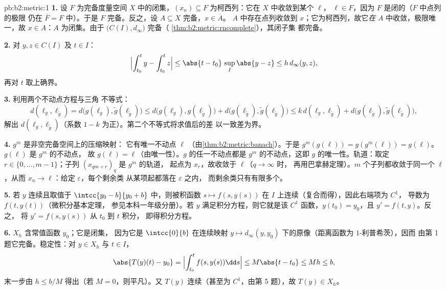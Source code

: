 \begin{solution}{pb:b2:metric:1}
\textbf{1.} 设 $F$ 为完备度量空间 $X$ 中的闭集，$(x_n)
\subseteq F$ 为柯西列：它在 $X$ 中收敛到某个 $\ell$，
$\ell \in F$，因为 $F$ 是闭的（$F$ 中点列的极限
仍在 $\overline F = F$ 中）。于是 $F$ 完备。反之，设 $A
\subseteq X$ 完备，$x \in \overline A$。
$A$ 中存在点列收敛到 $x$；它为柯西列，故它\emph{在}
$A$ 中收敛，极限唯一，故 $x \in A$：$A$ 为闭集。由于
$\bigl(C(I), d_\infty\bigr)$ 完备（
\cref{thm:b2:metric:rncomplete}），其闭子集
都完备。

\textbf{2.} 对 $y, z \in C(I)$ 及 $t \in I$：
\[
\Bigl|\int_{t_0}^{t}y - \int_{t_0}^{t}z\Bigr| \leq
\abs{t - t_0}\,\sup_I\abs{y - z} \leq h\,d_\infty(y, z),
\]
再对 $t$ 取上确界。

\textbf{3.} 利用两个不动点方程与三角
不等式：
\[
d(\ell_g, \ell_{\widetilde g})
= d\bigl(g(\ell_g), \widetilde g(\ell_{\widetilde g})\bigr)
\leq d\bigl(g(\ell_g), g(\ell_{\widetilde g})\bigr) +
d\bigl(g(\ell_{\widetilde g}), \widetilde g(\ell_{\widetilde
g})\bigr)
\leq k\,d(\ell_g, \ell_{\widetilde g}) +
d\bigl(g(\ell_{\widetilde g}), \widetilde g(\ell_{\widetilde
g})\bigr),
\]
解出 $d(\ell_g, \ell_{\widetilde g})$（系数
$1 - k$ 为正）。第二个不等式将求值后的差
以一致差为界。

\textbf{4.} $g^m$ 是非空完备空间上的压缩映射：
它有唯一不动点 $\ell$
（由\cref{thm:b2:metric:banach}）。于是 $g^m(g(\ell)) =
g(g^m(\ell)) = g(\ell)$。$g(\ell)$ 是 $g^m$ 的不动点，
故 $g(\ell) = \ell$（由唯一性）。$g$ 的任一不动点都是
$g^m$ 的不动点，这即 $g$ 的唯一性。轨道：取定 $r \in \{0, \dots,
m-1\}$；子列 $(x_{qm + r})_q$ 是 $g^m$ 的轨道，
起点为 $x_r$，故收敛于 $\ell$（$q \to \infty$ 时，
再用巴拿赫定理）。$m$ 个子列都收敛于同一个
$\ell$，从而 $x_n \to \ell$：给定 $\varepsilon$，每个剩余类
从某项起都落在 $\varepsilon$ 之内，
而剩余类只有有限多个。

\textbf{5.} 若 $y$ 连续且取值于 $\intcc{y_0 -
b}{y_0 + b}$ 中，则被积函数 $s \mapsto f(s, y(s))$
在 $I$ 上连续（复合而得），因此右端项为 $C^1$，
导数为 $f(t, y(t))$（微积分基本定理，
参见本科一年级分册）。若 $y$ 满足积分方程，则它就是该
$C^1$ 函数，$y(t_0) = y_0$，且 $y' = f(t, y)$。反之，
将 $y' = f(s, y(s))$ 从 $t_0$ 到 $t$ 积分，
即得积分方程。

\textbf{6.} $X_h$ 含常值函数 $y_0$；它是闭集，
因为它是 $\intcc{0}{b}$ 在连续映射 $y
\mapsto d_\infty(y, y_0)$ 下的原像（距离函数为 $1$-利普希茨），因而
由第 1 题它完备。稳定性：对 $y \in X_h$ 与 $t \in
I$，
\[
\abs{T(y)(t) - y_0} = \Bigl|\int_{t_0}^{t}f(s, y(s))\dd s\Bigr|
\leq M\abs{t - t_0} \leq Mh \leq b ,
\]
末一步由 $h \leq b/M$ 得出（若 $M = 0$，则平凡）。又 $T(y)$
连续（甚至为 $C^1$，由第 5 题），故 $T(y) \in X_h$。


\end{solution}
